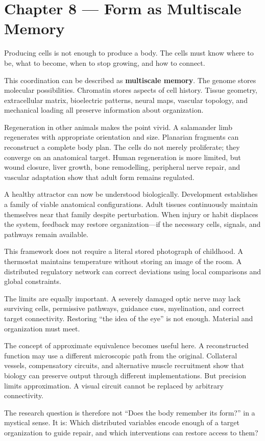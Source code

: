 \chapter{Chapter 8 --- Form as Multiscale Memory}\label{chapter-8-form-as-multiscale-memory}

Producing cells is not enough to produce a body. The cells must know where to be, what to become, when to stop growing, and how to connect.

This coordination can be described as \textbf{multiscale memory}. The genome stores molecular possibilities. Chromatin stores aspects of cell history. Tissue geometry, extracellular matrix, bioelectric patterns, neural maps, vascular topology, and mechanical loading all preserve information about organization.

Regeneration in other animals makes the point vivid. A salamander limb regenerates with appropriate orientation and size. Planarian fragments can reconstruct a complete body plan. The cells do not merely proliferate; they converge on an anatomical target. Human regeneration is more limited, but wound closure, liver growth, bone remodelling, peripheral nerve repair, and vascular adaptation show that adult form remains regulated.

A healthy attractor can now be understood biologically. Development establishes a family of viable anatomical configurations. Adult tissues continuously maintain themselves near that family despite perturbation. When injury or habit displaces the system, feedback may restore organization---if the necessary cells, signals, and pathways remain available.

This framework does not require a literal stored photograph of childhood. A thermostat maintains temperature without storing an image of the room. A distributed regulatory network can correct deviations using local comparisons and global constraints.

The limits are equally important. A severely damaged optic nerve may lack surviving cells, permissive pathways, guidance cues, myelination, and correct target connectivity. Restoring ``the idea of the eye'' is not enough. Material and organization must meet.

The concept of approximate equivalence becomes useful here. A reconstructed function may use a different microscopic path from the original. Collateral vessels, compensatory circuits, and alternative muscle recruitment show that biology can preserve output through different implementations. But precision limits approximation. A visual circuit cannot be replaced by arbitrary connectivity.

The research question is therefore not ``Does the body remember its form?'' in a mystical sense. It is: Which distributed variables encode enough of a target organization to guide repair, and which interventions can restore access to them?
